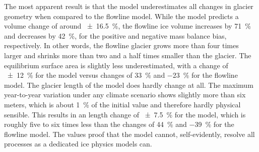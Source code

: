     The most apparent result is that the \vas{} model underestimates all changes in glacier geometry when compared to the flowline model. While the \vas{} model predicts a volume change of around \SI{\pm16.5}{\percent}, the flowline ice volume increases by \SI{71}{\percent} and decreases by \SI{42}{\percent}, for the positive and negative mass balance bias, respectively. In other words, the flowline glacier grows more than four times larger and shrinks more than two and a half times smaller than the \vas{} glacier.
    The equilibrium surface area is slightly less underestimated, with a change of \SI{\pm12}{\percent} for the \vas{} model versus changes of \SI{+33}{\percent} and \SI{-23}{\percent} for the flowline model. The glacier length of the \vas{} model does hardly change at all. The maximum year-to-year variation under any climate scenario shows slightly more than six meters, which is about \SI{1}{\percent} of the initial value and therefore hardly physical sensible. This results in an length change of \SI{\pm7.5}{\percent} for the \vas{} model, which is roughly five to six times less than the changes of \SI{+44}{\percent} and \SI{-39}{\percent} for the flowline model. The values proof that the \vas{} model cannot, self-evidently, resolve all processes as a dedicated ice physics models can. 
    
